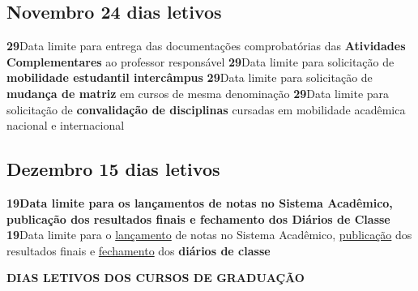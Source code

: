 \documentclass[thesis]{hmcposter}
\begin{document}
\begin{poster}
\subsection{Novembro \hfill 24 dias letivos}\textbf{29}\qquad Data limite para entrega das documentações comprobatórias das \textbf{Atividades Complementares} ao professor responsável \newline \null\textbf{29}\qquad Data limite para solicitação de \textbf{mobilidade estudantil intercâmpus} \newline \null\textbf{29}\qquad Data limite para solicitação de \textbf{mudança de matriz} em cursos de mesma denominação \newline \null\textbf{29}\qquad Data limite para solicitação de \textbf{convalidação de disciplinas} cursadas em mobilidade acadêmica nacional e internacional \newline \null\subsection{Dezembro \hfill 15 dias letivos}\textbf{19}\qquad \textbf{Data limite para os lançamentos de notas no Sistema Acadêmico, publicação dos resultados finais e fechamento dos Diários de Classe} \newline \null\textbf{19}\qquad Data limite para o \underline{lançamento} de notas no Sistema Acadêmico, \underline{publicação} dos resultados finais e \underline{fechamento} dos \textbf{diários de classe} \newline \null\newpage
~
\vfill
\begin{center}
\large \textbf{DIAS LETIVOS DOS CURSOS DE GRADUAÇÃO}
\newline
\null
\newline
\begin{table}
\centering
{}
\end{table}
\null
\end{center}

\end{poster}
\end{document}
